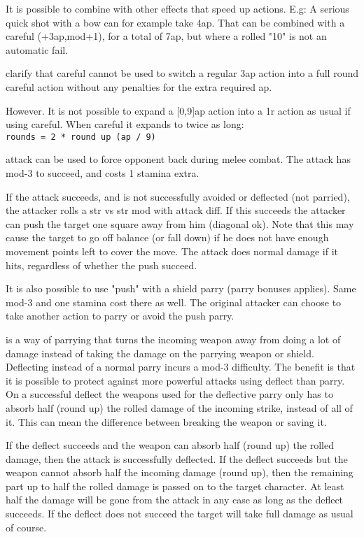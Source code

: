 It is possible to combine with other effects that speed up actions. E.g: A serious quick shot with a bow can for example take 4ap. That can be combined with a careful (+3ap,mod+1), for a total of 7ap, but where a rolled "10" is not an automatic fail.

\todo clarify that careful cannot be used to switch a regular 3ap action into a full round careful action without any penalties for the extra required ap.

However. It is not possible to expand a [0,9]ap action into a 1r action as usual if using careful. When careful it expands to twice as long: \\
\verb|rounds = 2 * round up (ap / 9)|


 attack can be used to force opponent back during melee combat. The attack has mod-3 to succeed, and costs 1 stamina extra.

If the attack succeeds, and is not successfully avoided or deflected (not parried), the attacker rolls a str vs str mod with attack diff. If this succeeds the attacker can push the target one square away from him (diagonal ok). Note that this may cause the target to go off balance (or fall down) if he does not have enough movement points left to cover the move. The attack does normal damage if it hits, regardless of whether the push succeed.

It is also possible to use "push" with a shield parry (parry bonuses applies). Same mod-3 and one stamina cost there as well. The original attacker can choose to take another action to parry or avoid the push parry.


 is a way of parrying that turns the incoming weapon away from doing a lot of damage instead of taking the damage on the parrying weapon or shield. Deflecting instead of a normal parry incurs a mod-3 difficulty. The benefit is that it is possible to protect against more powerful attacks using deflect than parry. On a successful deflect the weapons used for the deflective parry only has to absorb half (round up) the rolled damage of the incoming strike, instead of all of it. This can mean the difference between breaking the weapon or saving it.

If the deflect succeeds and the weapon can absorb half (round up) the rolled damage, then the attack is successfully deflected. If the deflect succeeds but the weapon cannot absorb half the incoming damage (round up), then the remaining part up to half the rolled damage is passed on to the target character. At least half the damage will be gone from the attack in any case as long as the deflect succeeds. If the deflect does not succeed the target will take full damage as usual of course.


